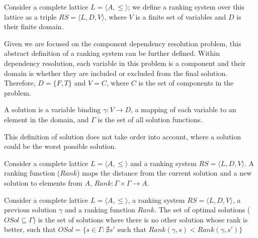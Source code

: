 \begin{defs}
Consider a complete lattice $L = \langle A, \leq \rangle$; we define 
a ranking system over this lattice as a triple $RS = \langle L, D, V \rangle$, 
where $V$ is a finite set of variables and $D$ is their finite domain.
\end{defs}

Given we are focused on the component dependency resolution problem,
this abstract definition of a ranking system can be further defined.
Within dependency resolution, 
each variable in this problem is a component and their domain is whether they are included or excluded from the final solution.
Therefore, $D = \{F,T\}$ and $V = C$, where $C$ is the set of components in the problem.

\begin{defs}
A solution is a variable binding $\gamma: V \rightarrow D$, a mapping of each variable to an element in the domain,
and $\Gamma$ is the set of all solution functions.
\end{defs}

This definition of solution does not take order into account, where a solution could be the worst possible solution.

\begin{defs}
Consider a complete lattice $L = \langle A, \leq \rangle$ and a ranking system $RS = \langle L, D, V \rangle$.
A ranking function ($Rank$) maps the distance from the current solution and a new solution to elements from $A$,
$Rank: \Gamma \times \Gamma \rightarrow A$.
\end{defs}

\begin{defs}
Consider a complete lattice $L = \langle A, \leq \rangle$, a ranking system $RS = \langle L, D, V \rangle$, a previous solution $\gamma$ and a ranking function $Rank$.
The set of optimal solutions ($OSol \subseteq \Gamma$) is the set of solutions where there is no other solution whose rank is better,
such that $OSol = \{ s \in \Gamma : \nexists s' \mbox{ such that } Rank(\gamma,s) < Rank(\gamma,s')\}$
\end{defs}

